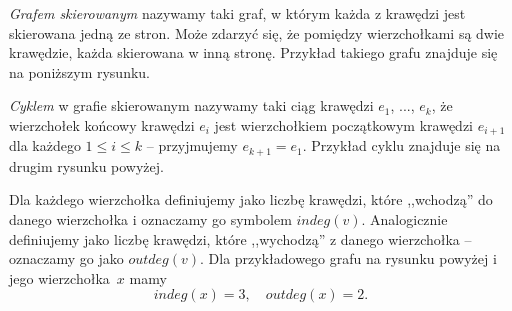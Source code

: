 


\noindent
\textit{Grafem skierowanym} nazywamy taki graf, w którym każda z krawędzi jest skierowana jedną ze stron. Może zdarzyć się, że pomiędzy wierzchołkami są dwie krawędzie, każda skierowana w inną stronę. Przykład takiego grafu znajduje się na poniższym rysunku.

\begin{center}
	\hspace{40px}
\end{center}

\noindent
\textit{Cyklem} w grafie skierowanym nazywamy taki ciąg krawędzi $e_1$, ..., $e_k$, że wierzchołek końcowy krawędzi $e_i$ jest wierzchołkiem początkowym krawędzi $e_{i + 1}$ dla każdego ${1 \leqslant i \leqslant k}$ -- przyjmujemy $e_{k + 1} = e_1$. Przykład cyklu znajduje się na drugim rysunku powyżej.

\vspace{5px}

\noindent
Dla każdego wierzchołka definiujemy  jako liczbę krawędzi, które ,,wchodzą'' do danego wierzchołka i oznaczamy go symbolem $indeg(v)$. Analogicznie definiujemy  jako liczbę krawędzi, które ,,wychodzą'' z danego wierzchołka -- oznaczamy go jako $outdeg(v)$. Dla przykładowego grafu na rysunku powyżej i jego wierzchołka~$x$ mamy
\[
	indeg(x) = 3,  \quad outdeg(x) = 2.
\]


